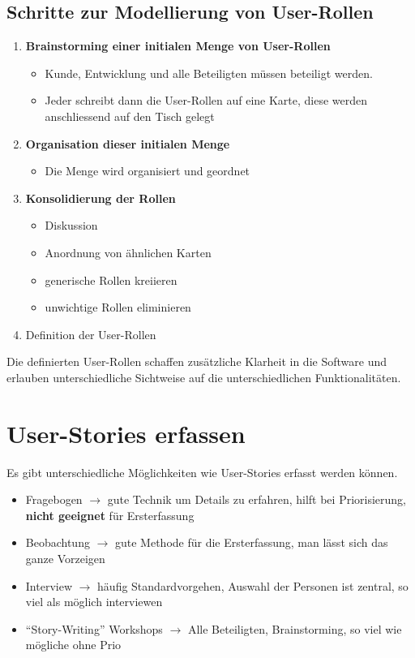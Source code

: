 \documentclass{report}
\theoremstyle{definition}
\theoremstyle{example}
\begin{document}
\subsection{Schritte zur Modellierung von User-Rollen}
\begin{enumerate}
	\item {\textbf{Brainstorming einer initialen Menge von User-Rollen}
	\begin{itemize}
		\item Kunde, Entwicklung und alle Beteiligten müssen beteiligt werden.
		\item Jeder schreibt dann die User-Rollen auf eine Karte, diese werden anschliessend auf den Tisch gelegt
	\end{itemize}
	}
	\item {\textbf{Organisation dieser initialen Menge}
	\begin{itemize}
		\item Die Menge wird organisiert und geordnet
	\end{itemize}
	}
	\item {\textbf{Konsolidierung der Rollen}
	\begin{itemize}
		 \item Diskussion
		 \item Anordnung von ähnlichen Karten
		 \item generische Rollen kreiieren
		 \item unwichtige Rollen eliminieren
	\end{itemize}
	}
	\item Definition der User-Rollen
\end{enumerate}
Die definierten User-Rollen schaffen zusätzliche Klarheit in die Software und erlauben unterschiedliche Sichtweise auf die unterschiedlichen Funktionalitäten.

\section{User-Stories erfassen}
Es gibt unterschiedliche Möglichkeiten wie User-Stories erfasst werden können.
\begin{itemize}
	\item Fragebogen $\rightarrow$ gute Technik um Details zu erfahren, hilft bei Priorisierung, \textbf{nicht geeignet} für Ersterfassung
	\item Beobachtung $\rightarrow$ gute Methode für die Ersterfassung, man lässt sich das ganze Vorzeigen
	\item Interview $\rightarrow$ häufig Standardvorgehen, Auswahl der Personen ist zentral, so viel als möglich interviewen
	\item ``Story-Writing'' Workshops $\rightarrow$ Alle Beteiligten, Brainstorming, so viel wie mögliche ohne Prio
\end{itemize}
\end{document}
